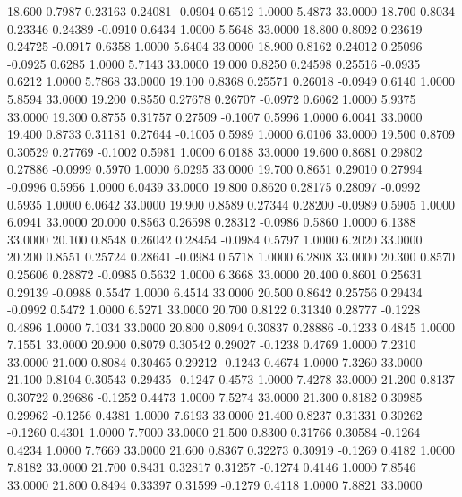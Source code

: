   18.600   0.7987   0.23163   0.24081  -0.0904   0.6512   1.0000   5.4873  33.0000
  18.700   0.8034   0.23346   0.24389  -0.0910   0.6434   1.0000   5.5648  33.0000
  18.800   0.8092   0.23619   0.24725  -0.0917   0.6358   1.0000   5.6404  33.0000
  18.900   0.8162   0.24012   0.25096  -0.0925   0.6285   1.0000   5.7143  33.0000
  19.000   0.8250   0.24598   0.25516  -0.0935   0.6212   1.0000   5.7868  33.0000
  19.100   0.8368   0.25571   0.26018  -0.0949   0.6140   1.0000   5.8594  33.0000
  19.200   0.8550   0.27678   0.26707  -0.0972   0.6062   1.0000   5.9375  33.0000
  19.300   0.8755   0.31757   0.27509  -0.1007   0.5996   1.0000   6.0041  33.0000
  19.400   0.8733   0.31181   0.27644  -0.1005   0.5989   1.0000   6.0106  33.0000
  19.500   0.8709   0.30529   0.27769  -0.1002   0.5981   1.0000   6.0188  33.0000
  19.600   0.8681   0.29802   0.27886  -0.0999   0.5970   1.0000   6.0295  33.0000
  19.700   0.8651   0.29010   0.27994  -0.0996   0.5956   1.0000   6.0439  33.0000
  19.800   0.8620   0.28175   0.28097  -0.0992   0.5935   1.0000   6.0642  33.0000
  19.900   0.8589   0.27344   0.28200  -0.0989   0.5905   1.0000   6.0941  33.0000
  20.000   0.8563   0.26598   0.28312  -0.0986   0.5860   1.0000   6.1388  33.0000
  20.100   0.8548   0.26042   0.28454  -0.0984   0.5797   1.0000   6.2020  33.0000
  20.200   0.8551   0.25724   0.28641  -0.0984   0.5718   1.0000   6.2808  33.0000
  20.300   0.8570   0.25606   0.28872  -0.0985   0.5632   1.0000   6.3668  33.0000
  20.400   0.8601   0.25631   0.29139  -0.0988   0.5547   1.0000   6.4514  33.0000
  20.500   0.8642   0.25756   0.29434  -0.0992   0.5472   1.0000   6.5271  33.0000
  20.700   0.8122   0.31340   0.28777  -0.1228   0.4896   1.0000   7.1034  33.0000
  20.800   0.8094   0.30837   0.28886  -0.1233   0.4845   1.0000   7.1551  33.0000
  20.900   0.8079   0.30542   0.29027  -0.1238   0.4769   1.0000   7.2310  33.0000
  21.000   0.8084   0.30465   0.29212  -0.1243   0.4674   1.0000   7.3260  33.0000
  21.100   0.8104   0.30543   0.29435  -0.1247   0.4573   1.0000   7.4278  33.0000
  21.200   0.8137   0.30722   0.29686  -0.1252   0.4473   1.0000   7.5274  33.0000
  21.300   0.8182   0.30985   0.29962  -0.1256   0.4381   1.0000   7.6193  33.0000
  21.400   0.8237   0.31331   0.30262  -0.1260   0.4301   1.0000   7.7000  33.0000
  21.500   0.8300   0.31766   0.30584  -0.1264   0.4234   1.0000   7.7669  33.0000
  21.600   0.8367   0.32273   0.30919  -0.1269   0.4182   1.0000   7.8182  33.0000
  21.700   0.8431   0.32817   0.31257  -0.1274   0.4146   1.0000   7.8546  33.0000
  21.800   0.8494   0.33397   0.31599  -0.1279   0.4118   1.0000   7.8821  33.0000
